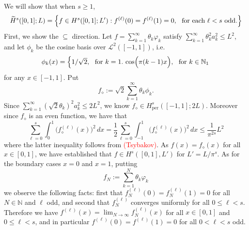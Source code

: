 \documentclass{article}
\newcommand{\1}{\mathbf{1}}
\newcommand{\Nbb}{\mathbb{N}}
\newcommand{\Leb}{\mathcal{L}}
\newcommand{\wt}[1]{\widetilde{#1}}
\theoremstyle{alden}
\theoremstyle{aldenthm}
\theoremstyle{definition}
\theoremstyle{remark}
\begin{document}
We will show that when $s \geq 1$,
\begin{equation*}
\wt{H}^s([0,1];L) = \Bigl\{f \in H^{s}([0,1];L'): f^{(\ell)}(0) = f^{(\ell)}(1) = 0,~~\textrm{for each $\ell < s$ odd.} \Bigr \}
\end{equation*}
First, we show the $\subseteq$ direction. Let $f = \sum_{k = 1}^{\infty} \theta_k \varphi_k$ satisfy $\sum_{k = 1}^{\infty} \theta_k^2 a_k^2 \leq L^2$, and let $\phi_k$ be the cosine basis over $\Leb^2([-1,1])$, i.e.
\begin{equation*}
\phi_k(x) = 
\begin{cases*}
1/\sqrt{2},~~\textrm{for $k = 1$.} \,
\cos\Bigl(\pi (k - 1) x\Bigr),~~\textrm{for $k \in \Nbb_1$}
\end{cases*}
\end{equation*}
for any $x \in [-1,1]$. Put
\begin{equation*}
f_{\diamond} := \sqrt{2} \sum_{k = 1}^{\infty} \theta_k \phi_k.
\end{equation*}
Since $\sum_{k = 1}^{\infty} (\sqrt{2}\theta_k)^2 a_k^2 \leq 2L^2$, we know $f_{\diamond} \in H_{\mathrm{per}}^s([-1,1];2L)$. Moreover since $f_{\diamond}$ is an even function, we have that
\begin{equation*}
\sum_{\ell = 0}^{s}\int_{0}^{1} \bigl(f_{\diamond}^{(\ell)}(x)\bigr)^2 \,dx = \frac{1}{2} \sum_{\ell = 0}^{s}\int_{-1}^{1} \bigl(f_{\diamond}^{(\ell)}(x)\bigr)^2 \,dx \leq \frac{1}{\pi^{2s}}L^2
\end{equation*}
where the latter inequality follows from \textcolor{red}{(Tsybakov)}.
As $f(x) = f_{\diamond}(x)$ for all $x \in [0,1]$, we have established that $f \in H^s([0,1],L')$ for $L' = L/\pi^s$. As for the boundary cases $x = 0$ and $x = 1$, putting
\begin{equation*}
f_N := \sum_{k = 1}^{N} \theta_k \varphi_k
\end{equation*}
we observe the following facts: first that $f_N^{(\ell)}(0) = f_N^{(\ell)}(1) = 0$ for all $N \in \Nbb$ and $\ell$ odd, and second that $f_N^{(\ell)}$ converges uniformly for all $0 \leq \ell < s$. Therefore we have $f^{(\ell)}(x) = \lim_{N \to \infty} f_N^{(\ell)}(x)$ for all $x \in [0,1]$ and $0 \leq \ell < s$, and in particular $f^{(\ell)}(0) = f^{(\ell)}(1) = 0$ for all $0 < \ell < s$ odd. 
\end{document}
